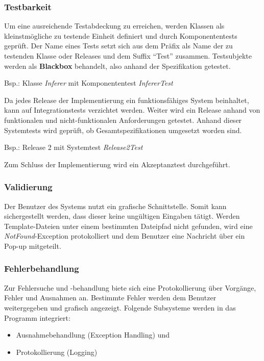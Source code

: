 \documentclass[11pt]{article}
\begin{document}
    \subsubsection{Testbarkeit}
    Um eine ausreichende Testabdeckung zu erreichen, werden Klassen als kleinstmögliche zu testende Einheit definiert
    und durch Komponententests geprüft.
    Der Name eines Tests setzt sich aus dem Präfix als Name der zu testenden Klasse oder Releases und dem Suffix
    "`Test"'
    zusammen.
    Testsubjekte werden als \textbf{Blackbox} behandelt, also anhand der Spezifikation getestet.
    \begin{center}
        Bsp.: Klasse \textit{Inferer} mit Komponententest \textit{InfererTest}
    \end{center}
    Da jedes Release der Implementierung ein funktionsfähiges System beinhaltet, kann auf Integrationstests
    verzichtet werden.
    Weiter wird ein Release anhand von funktionalen und nicht-funktionalen Anforderungen getestet.
    Anhand dieser Systemtests wird geprüft, ob Gesamtspezifikationen umgesetzt worden sind.
    \begin{center}
        Bsp.: Release 2 mit Systemtest \textit{Release2Test}
    \end{center}
    Zum Schluss der Implementierung wird ein Akzeptanztest durchgeführt.

    \subsubsection{Validierung}
    Der Benutzer des Systems nutzt ein grafische Schnittstelle.
    Somit kann sichergestellt werden, dass dieser keine ungültigen Eingaben tätigt.
    Werden Template-Dateien unter einem bestimmten Dateipfad nicht gefunden, wird eine \textit{NotFound}-Exception
    protokolliert und dem Benutzer eine Nachricht über ein Pop-up mitgeteilt.

    \subsubsection{Fehlerbehandlung}
    Zur Fehlersuche und -behandlung biete sich eine Protokollierung über Vorgänge, Fehler und Ausnahmen an.
    Bestimmte Fehler werden dem Benutzer weitergegeben und grafisch angezeigt.
    Folgende Subsysteme werden in das Programm integriert:
    \begin{itemize}
        \item Ausnahmebehandlung (Exception Handling) und
        \item Protokollierung (Logging)
    \end{itemize}
\end{document}

